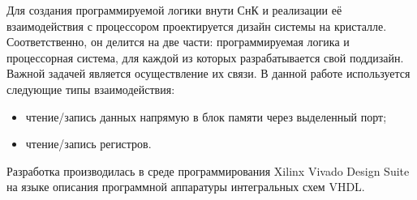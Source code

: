 Для создания программируемой логики внути СнК и реализации её взаимодействия с процессором проектируется дизайн системы на кристалле. Соответственно, он делится на две части: программируемая логика и процессорная система, для каждой из которых разрабатывается свой поддизайн. Важной задачей является осуществление их связи. В данной работе используется следующие типы взаимодействия:
\begin{itemize}
    \item чтение/запись данных напрямую в блок памяти через выделенный порт;
    \item чтение/запись регистров.
\end{itemize}\par
Разработка производилась в среде программирования Xilinx Vivado Design Suite на языке описания программной аппаратуры интегральных схем VHDL.
